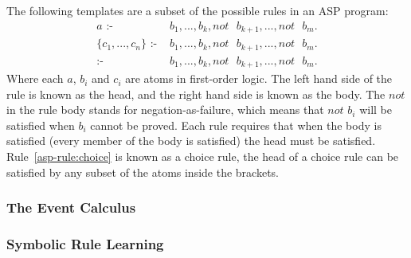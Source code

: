 \documentclass[../interim.tex]{subfiles}
\begin{document}
The following templates are a subset of the possible rules in an ASP program:
\begin{align}
  a \text{ :- }& b_1, ..., b_k, not \text{ } b_{k+1}, ..., not \text{ } b_m. \label{asp-rule:normal}\\
  \{c_1,...,c_n\} \text{ :- }& b_1,...,b_k, not \text{ } b_{k+1}, ..., not \text{ } b_m. \label{asp-rule:choice}\\
  \text{:- }& b_1,...,b_k, not \text{ } b_{k+1}, ..., not \text{ } b_m. \label{asp-rule:constraint}
\end{align}
Where each $a$, $b_i$ and $c_i$ are atoms in first-order logic. The left hand side of the rule is known as the head, and the right hand side is known as the body. The $not$ in the rule body stands for negation-as-failure, which means that $not$ $b_i$ will be satisfied when $b_i$ cannot be proved. Each rule requires that when the body is satisfied (every member of the body is satisfied) the head must be satisfied. Rule~\ref{asp-rule:choice} is known as a choice rule, the head of a choice rule can be satisfied by any subset of the atoms inside the brackets. %

\subsubsection{The Event Calculus}

\subsubsection{Symbolic Rule Learning}
\end{document}
